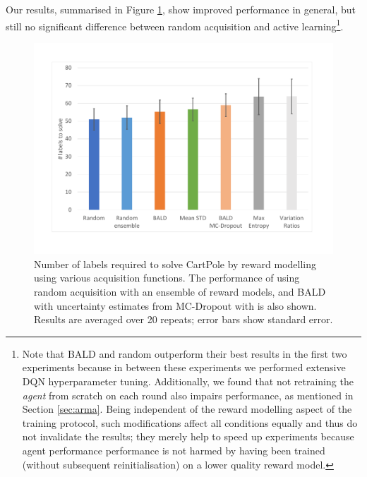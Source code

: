 \documentclass[11pt, a4paper, bibliography=totoc]{report}
\begin{document}
Our results, summarised in Figure \ref{fig:cartpole_final}, show improved performance in general, but still no significant difference between random acquisition and active learning\footnote{Note that BALD and random outperform their best results in the first two experiments because in between these experiments we performed extensive DQN hyperparameter tuning. Additionally, we found that not retraining the \textit{agent} from scratch on each round also impairs performance, as mentioned in Section \ref{sec:arma}. Being independent of the reward modelling aspect of the training protocol, such modifications affect all conditions equally and thus do not invalidate the results; they merely help to speed up experiments because agent performance performance is not harmed by having been trained (without subsequent reinitialisation) on a lower quality reward model.}.
\begin{figure}[h]
	\centering
	\includegraphics[width=\textwidth]{cartpole_final}
	\caption{Number of labels required to solve CartPole by reward modelling using various acquisition functions. The performance of using random acquisition with an ensemble of reward models, and BALD with uncertainty estimates from MC-Dropout with is also shown. Results are averaged over 20 repeats; error bars show standard error.}
	\label{fig:cartpole_final}
\end{figure}
\end{document}
